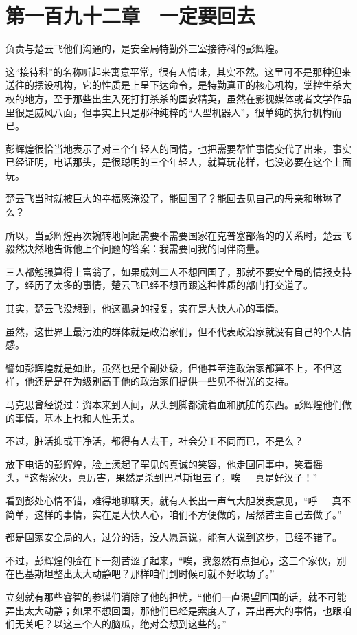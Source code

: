 \section{第一百九十二章　一定要回去}

负责与楚云飞他们沟通的，是安全局特勤外三室接待科的彭辉煌。

这“接待科”的名称听起来寓意平常，很有人情味，其实不然。这里可不是那种迎来送往的摆设机构，它的性质是上呈下达命令，是特勤真正的核心机构，掌控生杀大权的地方，至于那些出生入死打打杀杀的国安精英，虽然在影视媒体或者文学作品里很是威风八面，但事实上只是那种纯粹的“人型机器人”，很单纯的执行机构而已。

彭辉煌很恰当地表示了对三个年轻人的同情，也把需要帮忙事情交代了出来，事实已经证明，电话那头，是很聪明的三个年轻人，就算玩花样，也没必要在这个上面玩。

楚云飞当时就被巨大的幸福感淹没了，能回国了？能回去见自己的母亲和琳琳了么？

所以，当彭辉煌再次婉转地问起需要不需要国家在克普塞部落的的关系时，楚云飞毅然决然地告诉他上个问题的答案：我需要同我的同伴商量。

三人都勉强算得上富翁了，如果成刘二人不想回国了，那就不要安全局的情报支持了，经历了太多的事情，楚云飞已经不想再跟这种性质的部门打交道了。

其实，楚云飞没想到，他这孤身的报复，实在是大快人心的事情。

虽然，这世界上最污浊的群体就是政治家们，但不代表政治家就没有自己的个人情感。

譬如彭辉煌就是如此，虽然也是个副处级，但他甚至连政治家都算不上，不但这样，他还是是在为级别高于他的政治家们提供一些见不得光的支持。

马克思曾经说过：资本来到人间，从头到脚都流着血和肮脏的东西。彭辉煌他们做的事情，基本上也和人性无关。

不过，脏活抑或干净活，都得有人去干，社会分工不同而已，不是么？

放下电话的彭辉煌，脸上漾起了罕见的真诚的笑容，他走回同事中，笑着摇头，“这帮家伙，真厉害，果然是杀到巴基斯坦去了，唉~~~真是好汉子！”

看到彭处心情不错，难得地聊聊天，就有人长出一声气大胆发表意见，“呼~~~真不简单，这样的事情，实在是大快人心，咱们不方便做的，居然苦主自己去做了。”

都是国家安全局的人，过分的话，没人愿意说，能有人说到这步，已经不错了。

不过，彭辉煌的脸在下一刻苦涩了起来，“唉，我忽然有点担心，这三个家伙，别在巴基斯坦整出太大动静吧？那样咱们到时候可就不好收场了。”

立刻就有那些睿智的参谋们消除了他的担忧，“他们一直渴望回国的话，就不可能弄出太大动静；如果不想回国，那他们已经是索度人了，弄出再大的事情，也跟咱们无关吧？以这三个人的脑瓜，绝对会想到这些的。”

